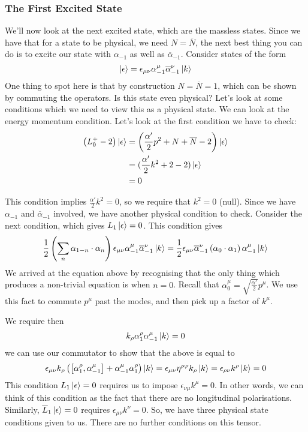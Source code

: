 \documentclass[11pt, oneside]{article}   	%
\theoremstyle{slanted}
\begin{document}
\subsubsection{The First Excited State}
We'll now look at the next excited state, 
which are the massless states.
Since we have that for a state to be physical, we 
need $ N  = \overline{ N } $, the 
next best thing you can do is to excite 
our state with $ \alpha_{ - 1 }   $ as well 
as $ \overline{ \alpha } _{ - 1 } $. 
Consider states of the form 
\[
 \ket{ \epsilon }  = \epsilon _{ \mu \nu } \alpha _{ -1 } ^ \mu \overline{ \alpha } _{ - 1 } ^ \nu 
 \ket{ k } 
\] One thing to spot here is that by construction 
$ N = \overline{ N }  = 1 $, which 
can be shown by commuting the operators. 
Is this state even physical? 
Let's look at some conditions which we need to view this as a physical state. 
We can look at the energy momentum condition. 
Let's look at the first condition we have to check:  
\begin{align*}
	\left( L_0 ^ +  - 2  \right) \ket{ \epsilon }  &=  \left( 
	\frac{\alpha ' }{ 2} p ^ 2 + N + \overline{ N }  - 2 \right) \ket{ \epsilon}   \\
						       &=  ( \frac{\alpha  ' }{ 2 } k ^ 2 + 2 - 2
						       ) \ket{ \epsilon } \\
						       &=  0  
\end{align*}

This condition implies $ \frac{\alpha ' }{ 2 } k ^ 2  = 0 $, 
so we require that $ k ^ 2  = 0 $ (null). 
Since we have $ \alpha _{ - 1 } $ and $ \overline{ \alpha } _{ - 1 } $
involved, we have another physical condition to check. 
Consider the next condition, which 
gives $ L _ 1 \ket{ \epsilon }   =0 $. 
This condition gives 
\[
	\frac{1}{2 } \left( \sum _ n \alpha _{ 1 - n} \cdot  \alpha _ n  \right)  \epsilon 
	_{ \mu \nu } \alpha _{ - 1 } ^ \mu \overline{ \alpha } _{  - 1  }^{ \nu } \ket{ k } 
	= \frac{1}{2} \epsilon _{ \mu \nu } \overline{ \alpha  }_{ - 1 } 
	^ \nu \left( \alpha _ 0 \cdot  \alpha_ 1 \right) \alpha _{ -  1 } ^ \mu  \ket{ k } 
\] We arrived at the 
equation above by recognising that the only thing which produces a non-trivial 
equation is when $ n  =0$.
Recall that $ \alpha _ 0 ^ \mu  = \sqrt{ \frac{\alpha ' }{ 2 } }  p ^ \mu $. 
We use this fact to commute $ p ^ \mu $ past the 
modes, and then pick up a 
factor of $ k ^ \mu $. 

We require then 
\[
 k _ \rho \alpha _ 1 ^ \rho \alpha _{ - 1 } ^ \mu \ket{ k }  = 0 
\] we can use our commutator 
to show that the above is 
equal to 
\[
 \epsilon _{ \mu \nu } k _ \rho \left( \left[  \alpha _ 1 ^ \rho , \alpha _{ - 1 } ^ \mu  \right]  + 
 \alpha _{ - 1 } ^ \mu \alpha _ 1 ^ \rho  \right)  \ket{ k }  = \epsilon _{ \mu\nu  } 
 \eta ^{ \mu \rho } k _ \rho \ket{ k }  = \epsilon _{ \rho \nu } k ^ \rho \ket{ k }  = 0
\] 
This condition $ L _ 1 \ket{ \epsilon }   = 0 $ requires 
us to impose $ \epsilon _{ \nu \mu } k ^ \mu  = 0 $. 
In other words, we 
can think of this condition as the fact that 
there are no longitudinal polarisations.
Similarly, $ \overline{ L }_ 1 \ket{ \epsilon }  =0 $  requires 
$ \epsilon _{ \mu \nu } k ^ \nu  =0 $. 
So, 
we have three physical state conditions given to us. 
There are no further conditions on this tensor. 
\end{document}
